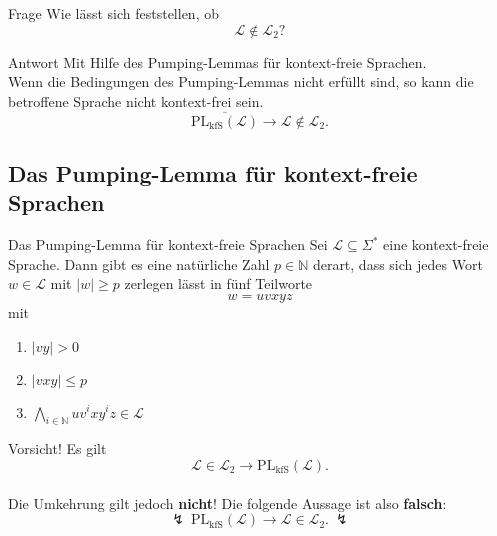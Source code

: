 \documentclass[]{beamer}
\begin{document}
\begin{frame}[<+->][squeeze]{}
  \begin{alertblock}{Frage}
    Wie lässt sich feststellen, ob
      \[\mathcal{L} \notin \mathcal{L}_2 \text{?}\]
  \end{alertblock}
  
  \begin{exampleblock}{Antwort}
    Mit Hilfe des Pumping-Lemmas für kontext-freie Sprachen. \\
    \vspace*{0.5em}
    Wenn die Bedingungen des Pumping-Lemmas nicht erfüllt sind, so kann die betroffene Sprache nicht kontext-frei sein.
      \[\overline{\mathrm{PL_{kfS}}(\mathcal{L})} \rightarrow \mathcal{L} \notin \mathcal{L}_2.\]
  \end{exampleblock}
\end{frame}

\subsection{Das Pumping-Lemma für kontext-freie Sprachen}
\begin{frame}[squeeze]{}
  \begin{block}{Das Pumping-Lemma für kontext-freie Sprachen}
    Sei $\mathcal{L} \subseteq \Sigma^*$ eine kontext-freie Sprache.
    Dann gibt es eine natürliche Zahl $p \in \mathbb{N}$ derart, dass sich jedes Wort $w \in \mathcal{L}$ mit $|w| \geq p$ zerlegen lässt in fünf Teilworte
      \[w = uvxyz\]
    mit
    \begin{enumerate}
      \item $|vy| > 0$
      \item $|vxy| \leq p$
      \item $\underset{i \in \mathbb{N}}{\bigwedge} uv^ixy^iz \in \mathcal{L}$
    \end{enumerate}
  \end{block}
  
  \pause
  
  \begin{alertblock}{Vorsicht!}
    Es gilt
    \vspace*{-0.5em}
    \[\mathcal{L} \in \mathcal{L}_2 \rightarrow \mathrm{PL_{kfS}} \left( \mathcal{L} \right).\]\\
    \vspace*{0.5em}
    Die Umkehrung gilt jedoch \textbf{nicht}! Die folgende Aussage ist also \textbf{falsch}:
    \vspace*{-0.5em}
    \[\lightning ~ \mathrm{PL_{kfS}} \left( \mathcal{L} \right) \rightarrow \mathcal{L} \in \mathcal{L}_2. ~ \lightning\]
  \end{alertblock}
\end{frame}
\end{document}
